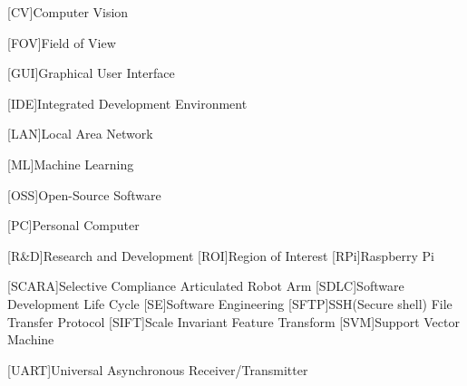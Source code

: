 \begin{acronym}
	[CV]{Computer Vision}
	
	[FOV]{Field of View}
	
	[GUI]{Graphical User Interface}
	
	[IDE]{Integrated Development Environment}
	
	[LAN]{Local Area Network}
	
	[ML]{Machine Learning}
	
	[OSS]{Open-Source Software}
	
	[PC]{Personal Computer}
	
	[R\&D]{Research and Development}
	[ROI]{Region of Interest}
	[RPi]{Raspberry Pi}
			
	[SCARA]{Selective Compliance Articulated Robot Arm}
	[SDLC]{Software Development Life Cycle}
	[SE]{Software Engineering}
	[SFTP]{SSH(Secure shell) File Transfer Protocol}
	[SIFT]{Scale Invariant Feature Transform}
	[SVM]{Support Vector Machine}
	
	[UART]{Universal Asynchronous Receiver/Transmitter}
\end{acronym}

